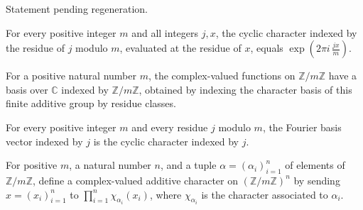 \begin{theorem}
\label{FABL.zmodCharacter_injective}
\leanok
{}
Statement pending regeneration.
\end{theorem}

\begin{theorem}
\label{FABL.zmodCharacter_intCast}
\leanok
{}
For every positive integer $m$ and all integers $j,x$, the cyclic character indexed by
the residue of $j$ modulo $m$, evaluated at the residue of $x$, equals $\exp\!\left(2\pi
i\,\frac{jx}{m}\right)$.
\end{theorem}

\begin{definition}
\label{FABL.zmodFourierBasis}
\leanok
{}
For a positive natural number $m$, the complex-valued functions on
$\mathbb{Z}/m\mathbb{Z}$ have a basis over $\mathbb{C}$ indexed by
$\mathbb{Z}/m\mathbb{Z}$, obtained by indexing the character basis of this finite
additive group by residue classes.
\end{definition}

\begin{theorem}
\label{FABL.zmodFourierBasis_apply}
\leanok
{}
For every positive integer $m$ and every residue $j$ modulo $m$, the Fourier basis
vector indexed by $j$ is the cyclic character indexed by $j$.
\end{theorem}

\begin{definition}
\label{FABL.zmodProductCharacter}
\leanok
{}
For positive $m$, a natural number $n$, and a tuple $\alpha=(\alpha_i)_{i=1}^n$ of
elements of $\mathbb{Z}/m\mathbb{Z}$, define a complex-valued additive character on
$(\mathbb{Z}/m\mathbb{Z})^n$ by sending $x=(x_i)_{i=1}^n$ to $\prod_{i=1}^n
\chi_{\alpha_i}(x_i)$, where $\chi_{\alpha_i}$ is the character associated to
$\alpha_i$.
\end{definition}

